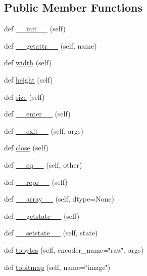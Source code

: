 \subsection*{Public Member Functions}
\begin{DoxyCompactItemize}
\item 
def \hyperlink{classPIL_1_1Image_1_1Image_aaa737c90e07e2170b5ceffc43d8c0be2}{\+\_\+\+\_\+init\+\_\+\+\_\+} (self)
\item 
def \hyperlink{classPIL_1_1Image_1_1Image_a48ed0b516213ec0d04b382fdcaf25152}{\+\_\+\+\_\+getattr\+\_\+\+\_\+} (self, name)
\item 
def \hyperlink{classPIL_1_1Image_1_1Image_a7b24041e769b1371ee37a0509c74e4aa}{width} (self)
\item 
def \hyperlink{classPIL_1_1Image_1_1Image_ae94a49c83ae90fd02e41aa5fe4a2752b}{height} (self)
\item 
def \hyperlink{classPIL_1_1Image_1_1Image_a0f36830cb12ce70f2193bc401e7e1ef7}{size} (self)
\item 
def \hyperlink{classPIL_1_1Image_1_1Image_a36930b7b18ea13b7a662309a687f42ae}{\+\_\+\+\_\+enter\+\_\+\+\_\+} (self)
\item 
def \hyperlink{classPIL_1_1Image_1_1Image_a2819e31e8d48cd041990b8269acfedb6}{\+\_\+\+\_\+exit\+\_\+\+\_\+} (self, args)
\item 
def \hyperlink{classPIL_1_1Image_1_1Image_a999ebe874d82490f56f85d0336e750ce}{close} (self)
\item 
def \hyperlink{classPIL_1_1Image_1_1Image_a29608dc28ca04fd9f87590af3128d5a3}{\+\_\+\+\_\+eq\+\_\+\+\_\+} (self, other)
\item 
def \hyperlink{classPIL_1_1Image_1_1Image_a3f1c2d72d054f348c5e05c7975304689}{\+\_\+\+\_\+repr\+\_\+\+\_\+} (self)
\item 
def \hyperlink{classPIL_1_1Image_1_1Image_a0d105622889d05bcb55d5301237cfeb9}{\+\_\+\+\_\+array\+\_\+\+\_\+} (self, dtype=None)
\item 
def \hyperlink{classPIL_1_1Image_1_1Image_afee2587194c550dcc1e8a9a1c1c38a9c}{\+\_\+\+\_\+getstate\+\_\+\+\_\+} (self)
\item 
def \hyperlink{classPIL_1_1Image_1_1Image_af33ee4d0463374e58bee6638163c5326}{\+\_\+\+\_\+setstate\+\_\+\+\_\+} (self, state)
\item 
def \hyperlink{classPIL_1_1Image_1_1Image_ab7cdf135e49111cd62fae555e637b92f}{tobytes} (self, encoder\+\_\+name=\char`\"{}raw\char`\"{}, args)
\item 
def \hyperlink{classPIL_1_1Image_1_1Image_a84e4d4559675e892abf31b9940a92dbb}{tobitmap} (self, name=\char`\"{}image\char`\"{})

\end{DoxyCompactItemize}
